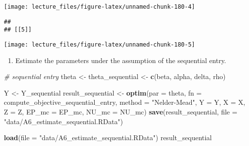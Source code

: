 \documentclass[
]{book}
\newenvironment{Shaded}{\begin{snugshade}}{\end{snugshade}}
\newcommand{\CommentTok}[1]{\textcolor[rgb]{0.56,0.35,0.01}{\textit{#1}}}
\newcommand{\DataTypeTok}[1]{\textcolor[rgb]{0.13,0.29,0.53}{#1}}
\newcommand{\KeywordTok}[1]{\textcolor[rgb]{0.13,0.29,0.53}{\textbf{#1}}}
\newcommand{\NormalTok}[1]{#1}
\newcommand{\StringTok}[1]{\textcolor[rgb]{0.31,0.60,0.02}{#1}}
\providecommand{\tightlist}{%
  \setlength{\itemsep}{0pt}\setlength{\parskip}{0pt}}
\begin{document}
\begin{center}\texttt{[image: lecture\_files/figure-latex/unnamed-chunk-180-4]} \end{center}

\begin{verbatim}
## 
## [[5]]
\end{verbatim}

\begin{center}\texttt{[image: lecture\_files/figure-latex/unnamed-chunk-180-5]} \end{center}

\begin{enumerate}
\def\labelenumi{\arabic{enumi}.}
\setcounter{enumi}{5}
\tightlist
\item
  Estimate the parameters under the assumption of the sequential entry.
\end{enumerate}

\begin{Shaded}
\begin{Highlighting}[]
\CommentTok{# sequential entry}
\NormalTok{theta <-}\StringTok{ }\NormalTok{theta_sequential <-}
\StringTok{  }\KeywordTok{c}\NormalTok{(beta, alpha, delta, rho)}
\end{Highlighting}
\end{Shaded}

\begin{Shaded}
\begin{Highlighting}[]
\NormalTok{Y <-}\StringTok{ }\NormalTok{Y_sequential}
\NormalTok{result_sequential <-}
\StringTok{  }\KeywordTok{optim}\NormalTok{(}\DataTypeTok{par =}\NormalTok{ theta,}
        \DataTypeTok{fn =}\NormalTok{ compute_objective_sequential_entry,}
        \DataTypeTok{method =} \StringTok{"Nelder-Mead"}\NormalTok{,}
        \DataTypeTok{Y =}\NormalTok{ Y,}
        \DataTypeTok{X =}\NormalTok{ X,}
        \DataTypeTok{Z =}\NormalTok{ Z,}
        \DataTypeTok{EP_mc =}\NormalTok{ EP_mc,}
        \DataTypeTok{NU_mc =}\NormalTok{ NU_mc)}
\KeywordTok{save}\NormalTok{(result_sequential, }\DataTypeTok{file =} \StringTok{"data/A6_estimate_sequential.RData"}\NormalTok{)}
\end{Highlighting}
\end{Shaded}

\begin{Shaded}
\begin{Highlighting}[]
\KeywordTok{load}\NormalTok{(}\DataTypeTok{file =} \StringTok{"data/A6_estimate_sequential.RData"}\NormalTok{)}
\NormalTok{result_sequential}
\end{Highlighting}
\end{Shaded}
\end{document}
